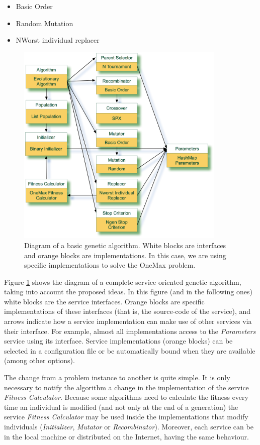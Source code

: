   

\begin{itemize}
\item Basic Order
\item Random Mutation
\item NWorst individual replacer
\end{itemize}

\begin{figure}
\centering
\includegraphics[width=10cm]{gfx/soaea/basicga.jpg}
\caption{Diagram of a basic genetic algorithm. White blocks are interfaces and orange blocks are implementations. In this case, we are using specific implementations to solve the OneMax problem.}
\label{BASICGAEXAMPLE}
\end{figure}





Figure \ref{BASICGAEXAMPLE} shows the diagram of a complete service oriented genetic algorithm, taking into account the proposed ideas. In this figure (and in the following ones) white blocks are the service interfaces. Orange blocks are specific implementations of these interfaces (that is, the source-code of the service), and  arrows indicate how a service implementation can make use of other services via their interface. For example, almost all implementations access to the {\em Parameters} service using its interface. Service implementations (orange blocks) can be selected in a configuration file or be automatically bound when they are available (among other options).



 The change from a problem instance to another is quite simple. It is only necessary to notify the algorithm a change in the implementation of the service {\em Fitness Calculator}. Because some algorithms need to calculate the fitness every time an individual is modified (and not only at the end of a generation) the service {\em Fitness Calculator} may be used inside the implementations that modify individuals ({\em Initializer}, {\em Mutator} or {\em Recombinator}). Moreover, each service can be in the local machine or distributed on the Internet, having the same behaviour. %

